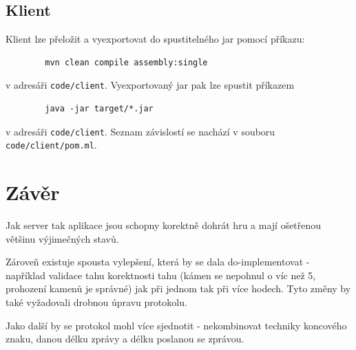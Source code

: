 \documentclass[11pt,a4paper]{scrartcl}
\begin{document}
	\subsection{Klient}
	Klient lze přeložit a vyexportovat do spustitelného jar pomocí příkazu:
	\begin{lstlisting}
		mvn clean compile assembly:single
	\end{lstlisting}
	v adresáři \verb|code/client|. Vyexportovaný jar pak lze spustit příkazem
	\begin{lstlisting}
		java -jar target/*.jar
	\end{lstlisting} v adresáři \verb|code/client|. Seznam závislostí se nachází v souboru \verb|code/client/pom.ml|.
		
	\section{Závěr}
	Jak server tak aplikace jsou schopny korektně dohrát hru a mají ošetřenou většinu výjimečných stavů. 
	
	Zároveň existuje spousta vylepšení, která by se dala do-implementovat - například validace tahu korektnosti tahu (kámen se nepohnul o víc než 5, prohození kamenů je správné) jak při jednom tak při více hodech. Tyto změny by také vyžadovali drobnou úpravu protokolu. 
	
	Jako další by se protokol mohl více sjednotit - nekombinovat techniky koncového znaku, danou délku zprávy a délku poslanou se zprávou.
	
\end{document}
